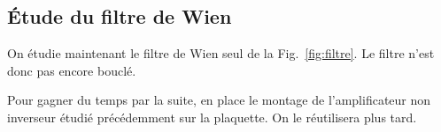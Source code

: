 \subsection{Étude du filtre de Wien}
On étudie maintenant le filtre de Wien seul de la Fig.~\ref{fig:filtre}. Le filtre n'est donc pas encore bouclé. 
\begin{danger}
  Pour gagner du temps par la suite,  en place le montage de l’amplificateur non inverseur étudié précédemment sur la plaquette. On le réutilisera plus tard.
\end{danger}

